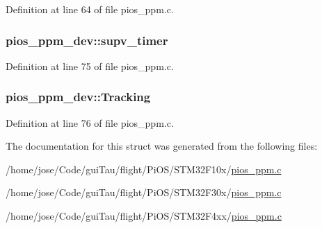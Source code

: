 Definition at line 64 of file pios\-\_\-ppm.\-c.

\hypertarget{structpios__ppm__dev_a8fdc1201ea1c7fe32a543a16a7b82be6}{
\subsubsection[{supv\-\_\-timer}]{ pios\-\_\-ppm\-\_\-dev\-::supv\-\_\-timer}}\label{structpios__ppm__dev_a8fdc1201ea1c7fe32a543a16a7b82be6}


Definition at line 75 of file pios\-\_\-ppm.\-c.

\hypertarget{structpios__ppm__dev_a70b81899f6e07040bde7d33575b7c7ac}{
\subsubsection[{Tracking}]{ pios\-\_\-ppm\-\_\-dev\-::\-Tracking}}\label{structpios__ppm__dev_a70b81899f6e07040bde7d33575b7c7ac}


Definition at line 76 of file pios\-\_\-ppm.\-c.



The documentation for this struct was generated from the following files\-:\begin{DoxyCompactItemize}
\item 
/home/jose/\-Code/gui\-Tau/flight/\-Pi\-O\-S/\-S\-T\-M32\-F10x/\hyperlink{_s_t_m32_f10x_2pios__ppm_8c}{pios\-\_\-ppm.\-c}\item 
/home/jose/\-Code/gui\-Tau/flight/\-Pi\-O\-S/\-S\-T\-M32\-F30x/\hyperlink{_s_t_m32_f30x_2pios__ppm_8c}{pios\-\_\-ppm.\-c}\item 
/home/jose/\-Code/gui\-Tau/flight/\-Pi\-O\-S/\-S\-T\-M32\-F4xx/\hyperlink{_s_t_m32_f4xx_2pios__ppm_8c}{pios\-\_\-ppm.\-c}\end{DoxyCompactItemize}
